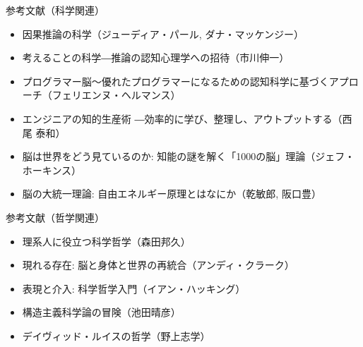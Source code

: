 \documentclass[12pt, unicode]{beamer}
\begin{document}
\begin{frame}{参考文献（科学関連）}
\begin{itemize}
\item 因果推論の科学（ジューディア・パール, ダナ・マッケンジー）
\item 考えることの科学―推論の認知心理学への招待（市川伸一）
\item プログラマー脳～優れたプログラマーになるための認知科学に基づくアプローチ（フェリエンヌ・ヘルマンス）
\item エンジニアの知的生産術 ―効率的に学び、整理し、アウトプットする（西尾 泰和）
\item 脳は世界をどう見ているのか: 知能の謎を解く「1000の脳」理論（ジェフ・ホーキンス）
\item 脳の大統一理論: 自由エネルギー原理とはなにか（乾敏郎, 阪口豊）
\end{itemize}
\end{frame}

\begin{frame}{参考文献（哲学関連）}
\begin{itemize}
\item 理系人に役立つ科学哲学（森田邦久）
\item 現れる存在: 脳と身体と世界の再統合（アンディ・クラーク）
\item 表現と介入: 科学哲学入門（イアン・ハッキング）
\item 構造主義科学論の冒険（池田晴彦）
\item デイヴィッド・ルイスの哲学（野上志学）
\end{itemize}
\end{frame}
\end{document}
